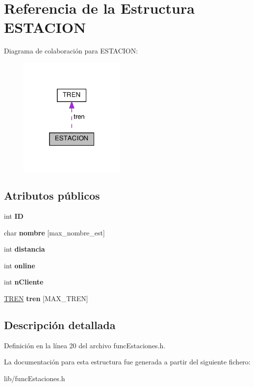 \hypertarget{structESTACION}{}\section{Referencia de la Estructura E\+S\+T\+A\+C\+I\+ON}
\label{structESTACION}


Diagrama de colaboración para E\+S\+T\+A\+C\+I\+ON\+:
\nopagebreak
\begin{figure}[H]
\begin{center}
\leavevmode
\includegraphics[width=148pt]{structESTACION__coll__graph}
\end{center}
\end{figure}
\subsection*{Atributos públicos}
\begin{DoxyCompactItemize}
\item 
\mbox{\label{structESTACION_a220ab1d0aa79ae0d5f700a34f9b1f75b}} 
int {\bfseries ID}
\item 
\mbox{\label{structESTACION_a0623825330679fe7b7801af96bd07102}} 
char {\bfseries nombre} \mbox{[}max\+\_\+nombre\+\_\+est\mbox{]}
\item 
\mbox{\label{structESTACION_ae479335d970fb4039e6950900c02ffb6}} 
int {\bfseries distancia}
\item 
\mbox{\label{structESTACION_acff63a58bcf539246362974272b8522d}} 
int {\bfseries online}
\item 
\mbox{\label{structESTACION_a7279959919554dd700ed1d99116f28c8}} 
int {\bfseries n\+Cliente}
\item 
\mbox{\label{structESTACION_af5b037396e812b2152cdf3c020878fe0}} 
\hyperlink{structTREN}{T\+R\+EN} {\bfseries tren} \mbox{[}M\+A\+X\+\_\+\+T\+R\+EN\mbox{]}
\end{DoxyCompactItemize}


\subsection{Descripción detallada}


Definición en la línea 20 del archivo func\+Estaciones.\+h.



La documentación para esta estructura fue generada a partir del siguiente fichero\+:\begin{DoxyCompactItemize}
\item 
lib/func\+Estaciones.\+h\end{DoxyCompactItemize}
